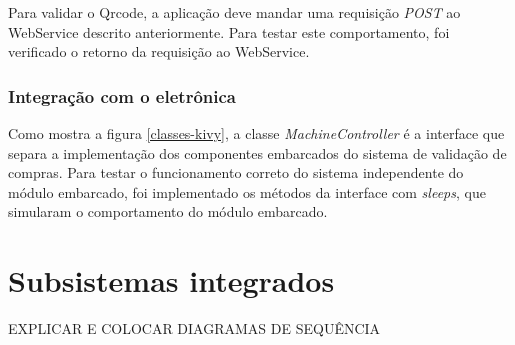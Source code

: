 Para validar o Qrcode, a aplicação deve mandar uma requisição \textit{POST} ao WebService descrito anteriormente.
Para testar este comportamento, foi verificado o retorno da requisição ao WebService.

\subsubsection{Integração com o eletrônica}

Como mostra a figura \ref{classes-kivy}, a classe \textit{MachineController} é a interface que separa
a implementação dos componentes embarcados do sistema de validação de compras. Para testar o funcionamento
correto do sistema independente do módulo embarcado, foi implementado os métodos da interface com
\textit{sleeps}, que simularam o comportamento do módulo embarcado.

\section{Subsistemas integrados}

EXPLICAR E COLOCAR DIAGRAMAS DE SEQUÊNCIA